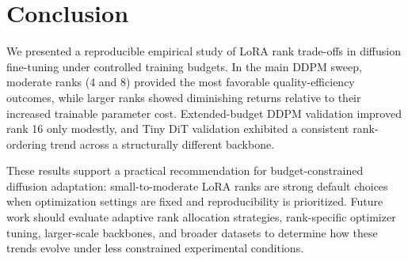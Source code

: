 \documentclass[pdflatex,sn-mathphys-num]{Springer_format/sn-jnl}
\begin{document}
  \section{Conclusion}
  \label{sec:conclusion}
  
  We presented a reproducible empirical study of LoRA rank trade-offs in diffusion
  fine-tuning under controlled training budgets. In the main DDPM sweep, moderate ranks
  (4 and 8) provided the most favorable quality-efficiency outcomes, while larger ranks
  showed diminishing returns relative to their increased trainable parameter cost.
  Extended-budget DDPM validation improved rank 16 only modestly, and Tiny DiT validation
  exhibited a consistent rank-ordering trend across a structurally different backbone.
  
  These results support a practical recommendation for budget-constrained diffusion
  adaptation: small-to-moderate LoRA ranks are strong default choices when optimization
  settings are fixed and reproducibility is prioritized. Future work should evaluate adaptive
  rank allocation strategies, rank-specific optimizer tuning, larger-scale backbones, and
  broader datasets to determine how these trends evolve under less constrained experimental
  conditions.
  
  
  
  
  
\end{document}
